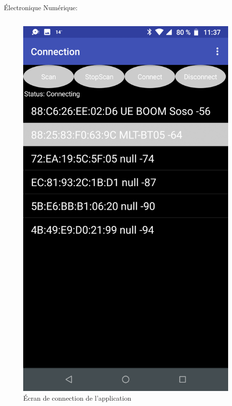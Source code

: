 \documentclass{beamer}
\begin{document}
\begin{frame}{Électronique Numérique:}
\begin{columns}[T]
\begin{column}{0.5\textwidth}
\begin{figure}
	    			\hspace*{2em}\includegraphics[height=0.8\textheight]{../Illus/AppConnection.png}
	    			\caption{Écran de connection de l'application}
	    		\end{figure}
	  		\end{column}
		\end{columns}
		
	\end{frame}
\end{document}
